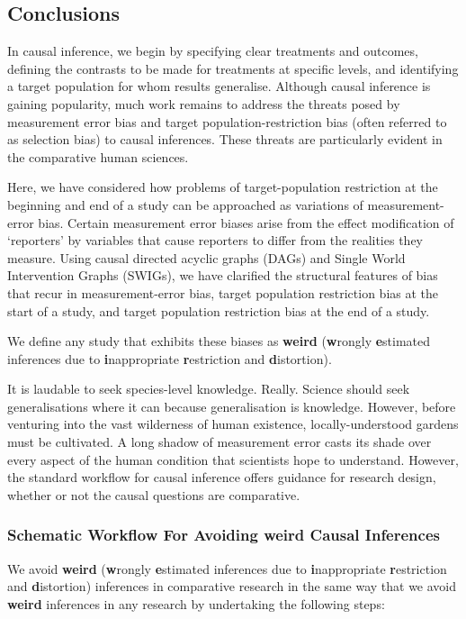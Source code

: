 \documentclass[
  single column]{article}
\begin{document}
\subsection{Conclusions}\label{conclusions}

In causal inference, we begin by specifying clear treatments and
outcomes, defining the contrasts to be made for treatments at specific
levels, and identifying a target population for whom results generalise.
Although causal inference is gaining popularity, much work remains to
address the threats posed by measurement error bias and target
population-restriction bias (often referred to as selection bias) to
causal inferences. These threats are particularly evident in the
comparative human sciences.

Here, we have considered how problems of target-population restriction
at the beginning and end of a study can be approached as variations of
measurement-error bias. Certain measurement error biases arise from the
effect modification of `reporters' by variables that cause reporters to
differ from the realities they measure. Using causal directed acyclic
graphs (DAGs) and Single World Intervention Graphs (SWIGs), we have
clarified the structural features of bias that recur in
measurement-error bias, target population restriction bias at the start
of a study, and target population restriction bias at the end of a
study.

We define any study that exhibits these biases as \textbf{weird}
(\textbf{w}rongly \textbf{e}stimated inferences due to
\textbf{i}nappropriate \textbf{r}estriction and \textbf{d}istortion).

It is laudable to seek species-level knowledge. Really. Science should
seek generalisations where it can because generalisation is knowledge.
However, before venturing into the vast wilderness of human existence,
locally-understood gardens must be cultivated. A long shadow of
measurement error casts its shade over every aspect of the human
condition that scientists hope to understand. However, the standard
workflow for causal inference offers guidance for research design,
whether or not the causal questions are comparative.

\subsubsection{Schematic Workflow For Avoiding weird Causal
Inferences}\label{schematic-workflow-for-avoiding-weird-causal-inferences}

We avoid \textbf{weird} (\textbf{w}rongly \textbf{e}stimated inferences
due to \textbf{i}nappropriate \textbf{r}estriction and
\textbf{d}istortion) inferences in comparative research in the same way
that we avoid \textbf{weird} inferences in any research by undertaking
the following steps:
\end{document}
